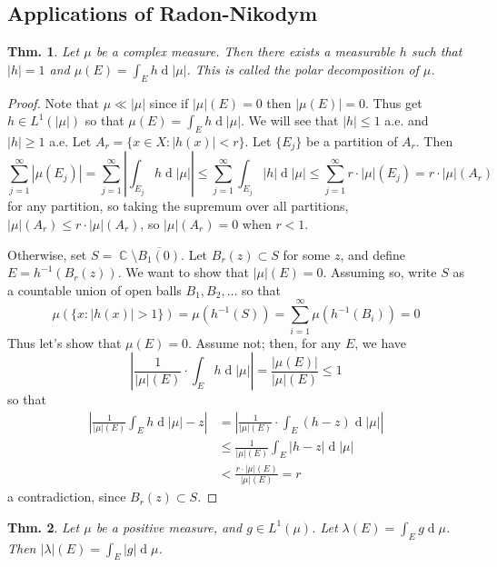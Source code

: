 \documentclass[12pt, a4paper]{book}
\DeclareMathOperator{\C}{\mathbb{C}}
\renewcommand{\d}[1]{\ensuremath{\operatorname{d}\!{#1}}} %
\newtheorem{theorem}{Thm.}[section]
\theoremstyle{nonumberplain}
\newtheorem{proof}{Proof}
\begin{document}
\subsection{Applications of Radon-Nikodym}
\begin{theorem}
    Let $\mu$ be a complex measure.
    Then there exists a measurable $h$ such that $|h|=1$ and $\mu(E)=\int_E h\d{|\mu|}$.
    This is called the polar decomposition of $\mu$.
\end{theorem}
\begin{proof}
    Note that $\mu\ll|\mu|$ since if $|\mu|(E)=0$ then $|\mu(E)|=0$.
    Thus get $h\in L^1(|\mu|)$ so that $\mu(E)=\int_E h\d{|\mu|}$.
    We will see that $|h|\leq 1$ a.e. and $|h|\geq 1$ a.e.
    Let $A_r=\{x\in X:|h(x)|<r\}$.
    Let $\{E_j\}$ be a partition of $A_r$.
    Then
    \[\sum\limits_{j=1}^\infty|\mu(E_j)|=\sum\limits_{j=1}^\infty\left\lvert\int_{E_j}h\d{|\mu|}\right\rvert\leq\sum\limits_{j=1}^\infty\int_{E_j}|h|\d{|\mu|}\leq\sum\limits_{j=1}^\infty r\cdot|\mu|(E_j)=r\cdot|\mu|(A_r)\]
    for any partition, so taking the supremum over all partitions, $|\mu|(A_r)\leq r\cdot|\mu|(A_r)$, so $|\mu|(A_r)=0$ when $r<1$.

    Otherwise, set $S=\C\setminus\overline{B_1(0)}$.
    Let $B_r(z)\subset S$ for some $z$, and define $E=h^{-1}(B_r(z))$.
    We want to show that $|\mu|(E)=0$.
    Assuming so, write $S$ as a countable union of open balls $B_1,B_2,\ldots$ so that
    \[\mu(\{x:|h(x)|>1\})=\mu(h^{-1}(S))=\sum\limits_{i=1}^\infty\mu(h^{-1}(B_i))=0\]
    Thus let's show that $\mu(E)=0$.
    Assume not; then, for any $E$, we have
    \[\left\lvert\frac{1}{|\mu|(E)}\cdot\int_E h\d{|\mu|}\right\rvert=\frac{|\mu(E)|}{|\mu|(E)}\leq 1\]
    so that
    \begin{align*}
        \left\lvert\frac{1}{|\mu|(E)}\int_E h\d{|\mu|}-z\right\rvert&=  \left\lvert\frac{1}{|\mu|(E)}\cdot\int_E(h-z)\d{|\mu|}\right\rvert\\
                                                                    &\leq\frac{1}{|\mu|(E)}\int_E|h-z|\d{|\mu|}\\
                                                                    &< \frac{r\cdot|\mu|(E)}{|\mu|(E)}=r
    \end{align*}
    a contradiction, since $B_r(z)\subset S$.
\end{proof}
\begin{theorem}
    Let $\mu$ be a positive measure, and $g\in L^1(\mu)$.
    Let $\lambda(E)=\int_E g\d{\mu}$.
    Then $|\lambda|(E)=\int_E|g|\d{\mu}$.
\end{theorem}
\end{document}
